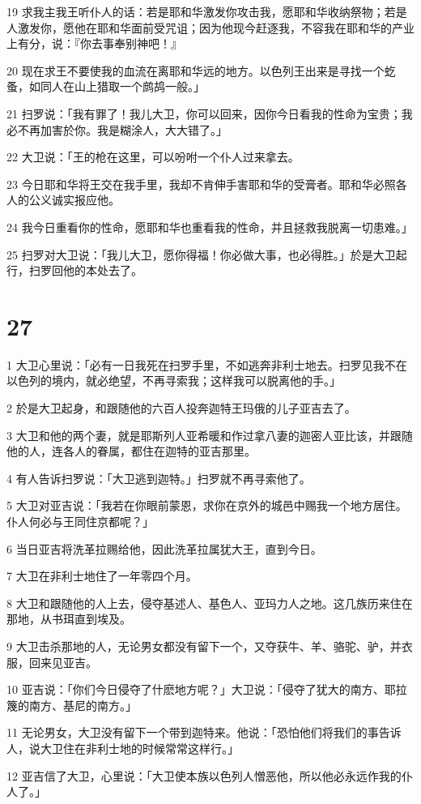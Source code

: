 \par 19 求我主我王听仆人的话：若是耶和华激发你攻击我，愿耶和华收纳祭物；若是人激发你，愿他在耶和华面前受咒诅；因为他现今赶逐我，不容我在耶和华的产业上有分，说：『你去事奉别神吧！』
\par 20 现在求王不要使我的血流在离耶和华远的地方。以色列王出来是寻找一个虼蚤，如同人在山上猎取一个鹧鸪一般。」
\par 21 扫罗说：「我有罪了！我儿大卫，你可以回来，因你今日看我的性命为宝贵；我必不再加害於你。我是糊涂人，大大错了。」
\par 22 大卫说：「王的枪在这里，可以吩咐一个仆人过来拿去。
\par 23 今日耶和华将王交在我手里，我却不肯伸手害耶和华的受膏者。耶和华必照各人的公义诚实报应他。
\par 24 我今日重看你的性命，愿耶和华也重看我的性命，并且拯救我脱离一切患难。」
\par 25 扫罗对大卫说：「我儿大卫，愿你得福！你必做大事，也必得胜。」於是大卫起行，扫罗回他的本处去了。

\chapter{27}

\par 1 大卫心里说：「必有一日我死在扫罗手里，不如逃奔非利士地去。扫罗见我不在以色列的境内，就必绝望，不再寻索我；这样我可以脱离他的手。」
\par 2 於是大卫起身，和跟随他的六百人投奔迦特王玛俄的儿子亚吉去了。
\par 3 大卫和他的两个妻，就是耶斯列人亚希暖和作过拿八妻的迦密人亚比该，并跟随他的人，连各人的眷属，都住在迦特的亚吉那里。
\par 4 有人告诉扫罗说：「大卫逃到迦特。」扫罗就不再寻索他了。
\par 5 大卫对亚吉说：「我若在你眼前蒙恩，求你在京外的城邑中赐我一个地方居住。仆人何必与王同住京都呢？」
\par 6 当日亚吉将洗革拉赐给他，因此洗革拉属犹大王，直到今日。
\par 7 大卫在非利士地住了一年零四个月。
\par 8 大卫和跟随他的人上去，侵夺基述人、基色人、亚玛力人之地。这几族历来住在那地，从书珥直到埃及。
\par 9 大卫击杀那地的人，无论男女都没有留下一个，又夺获牛、羊、骆驼、驴，并衣服，回来见亚吉。
\par 10 亚吉说：「你们今日侵夺了什麽地方呢？」大卫说：「侵夺了犹大的南方、耶拉篾的南方、基尼的南方。」
\par 11 无论男女，大卫没有留下一个带到迦特来。他说：「恐怕他们将我们的事告诉人，说大卫住在非利士地的时候常常这样行。」
\par 12 亚吉信了大卫，心里说：「大卫使本族以色列人憎恶他，所以他必永远作我的仆人了。」

